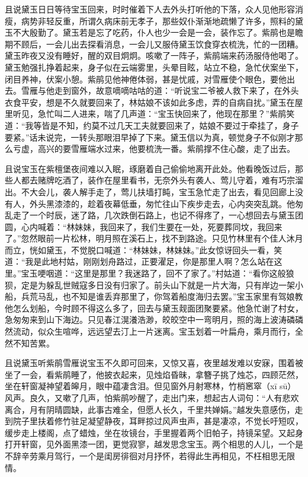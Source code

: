 \documentclass[12pt,oneside]{book}
\begin{document}
且说黛玉日日等待宝玉回来，时时催着下人去外头打听他的下落，众人见他形容消瘦，病势非轻反重，所谓久病床前无孝子，那些奴仆渐渐地疏懒了许多，照料的黛玉不大殷勤了。黛玉若是忘了吃药，仆人也少一会是一会，装作忘了。紫鹃也是瞻期不顾后，一会儿出去探看消息，一会儿又服侍黛玉饮食穿衣梳洗，忙的一团糟。黛玉昨夜又没有睡好，醒的双目炯炯。咳嗽了一阵子，紫鹃端来药汤服侍他喝了。黛玉勉强扎挣着起来，身子似在云端雾里，头晕目眩，站立不稳，急忙伏案坐下，闭目养神，伏案小憩。紫鹃见他神倦体弱，甚是忧戚，对雪雁使个眼色，要他出去。雪雁与他走到窗外，故意嘀嘀咕咕的道：“听说宝二爷被人救下来了，在外头衣食平安，想是不久就要回来了，林姑娘不该如此多虑，弄的自病自扰。”黛玉在屋里听见，急忙叫二人进来，喘了几声道：“宝玉快回来了，他现在那里？”紫鹃笑道：“我等皆是不知，约莫不过几天工夫就要回来了，姑娘不要过于牵挂了，身子要紧。”话未说完，一转头那眼泪早掉了下来。黛玉信以为真，顿觉身子不似刚才那么亏虚，高兴的要雪雁端水过来，他要梳洗一番。紫鹃撑不住心酸，走了出去。

且说宝玉在紫檀堡夜间难以入眠，琢磨着自己偷偷地离开此处。他看晚饭过后，那些人都去赌牌吃酒了，装作在屋里看书，无奈外头有袭人、莺儿守着，难有巧宗溜出。不大会儿，袭人解手走了，莺儿扶墙打盹，宝玉急忙走了出去，看见回廊上没有人，外头黑漆漆的，趁着夜幕低垂，匆忙往山下疾步走去，心内突突乱跳。他匆乱走了一个时辰，迷了路，几次跌倒石路上，也记不得疼了，一心想回去与黛玉团圆，心内喊着：“林妹妹，我回来了，我们生要在一处，死要葬同坟，我回来了。”忽然眼前一片松林，明月照在溪石上，找不到路途。只见竹林里有个佳人沐月而立，恍如黛玉，不觉脱口喊道：“林妹妹，林妹妹。”此女惊讶回头一看，笑道：“我是此地村姑，刚刚划舟路过，正要濯足，你是那里人啊？怎么站在这里。”宝玉哽咽道：“这里是那里？我迷路了，回不了家了。”村姑道：“看你这般狼狈，定是为躲乱世贼寇多日没有归家了。前头山下就是一片大海，只有岸边一架小船，兵荒马乱，也不知是谁丢弃那里了，你驾着船度海归去罢。”宝玉家里有驾娘教他怎么划船，今时顾不得这么多了，回去与黛玉觌面团聚要紧。他急忙谢了村女，急匆匆来到山下海边。只见春江滉瀁浩渺，皎皎空中一弯明月，照的海上波涛磷磷然流动，似众生喧哗，远远望去汀上一片迷离。宝玉划着一叶扁舟，乘月而行，全然不知苦累。

且说黛玉听紫鹃雪雁说宝玉不久即可回来，又惊又喜，夜里越发难以安寐，围着被坐了一会，看紫鹃睡了，他披衣起来，见烛焰昏昧，拿簪子挑了烛芯，四顾茫然，坐在轩窗凝神望着皞月，眼中蕴凄含泪。但见窗外月射寒林，竹梢窸窣（xī sū）风声。良久，又嗽了几声，怕紫鹃吵醒了，走出门来，想起古人词句：“人有悲欢离合，月有阴晴圆缺，此事古难全，但愿人长久，千里共婵娟。”越发失意感伤，走到院子里扶着修竹驻足凝望静夜，耳畔掠过风声虫声，甚是凄凉，不觉长吁短叹，缓步走上楼阁，点了蜡烛，坐在妆镜台，手里握着两个旧帕子，持镜呆望。又起身打开轩窗，见外面黑漆一团，更觉寂寥，越发思念宝玉。两个相思的人儿，一个是不辞辛劳乘月驾行，一个是闺房徘徊对月抒怀，若得此生再相见，不枉相思无限情。
\end{document}
